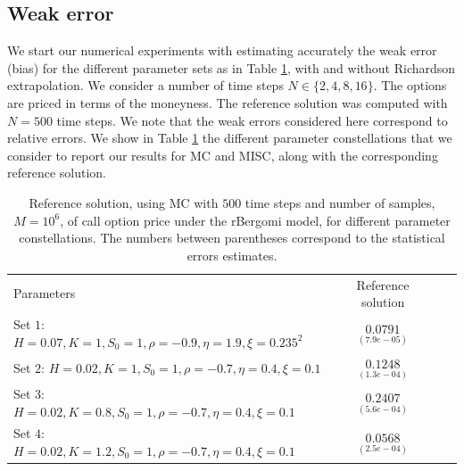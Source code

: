 
\subsection{Weak error} \label{sec:Weak error plots_no_change}

We start our numerical experiments with estimating accurately the weak error (bias)  for the different parameter sets as in Table \ref{table:Reference solution, using MC with $500$ time steps, of Call option price under rBergomi model, for different parameter constellation.}, with and without Richardson extrapolation.  We consider a number of time steps $N \in \{2,4,8,16\}$. The options are priced in terms of the moneyness.  The reference solution was computed with $N=500$ time steps. We note that the weak errors considered here correspond to relative errors. We show in Table \ref{table:Reference solution, using MC with $500$ time steps, of Call option price under rBergomi model, for different parameter constellation.} the different parameter constellations that we consider to report our results for MC and MISC, along with the corresponding reference solution.


\begin{table}[!h]
	\centering
	\begin{small}
	\begin{tabular}{l*{2}{c}r}
		Parameters            & Reference solution    \\

			Set $1$:	$H=0.07, K=1,S_0=1, \rho=-0.9, \eta=1.9,\xi=0.235^2$   & $\underset{(7.9e-05)}{0.0791}$  \\	

				Set $2$:	$H=0.02, K=1, S_0=1, \rho=-0.7, \eta=0.4,\xi=0.1$   & $\underset{(1.3e-04)}{0.1248}$  \\
					Set $3$:	$H=0.02, K=0.8,S_0=1, \rho=-0.7, \eta=0.4,\xi=0.1$   & $\underset{(5.6e-04)}{0.2407}$  \\
						Set $4$:	$H=0.02, K=1.2,S_0=1, \rho=-0.7, \eta=0.4,\xi=0.1$   & $\underset{(2.5e-04)}{0.0568}$  \\
		\hline
	\end{tabular}
\end{small}
	\caption{Reference solution, using MC with $500$ time steps and number of samples, $M=10^6$, of call option price under the rBergomi model, for different parameter constellations.  The numbers between parentheses correspond to the statistical errors estimates.}
	\label{table:Reference solution, using MC with $500$ time steps, of Call option price under rBergomi model, for different parameter constellation.}
\end{table}





